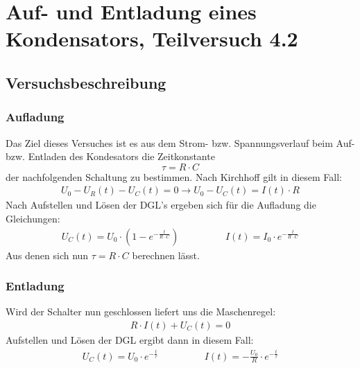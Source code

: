 \documentclass[12pt,a4paper]{article}
\begin{document}
\section{Auf- und Entladung eines Kondensators, Teilversuch 4.2}
\subsection{Versuchsbeschreibung}
\subsubsection*{Aufladung}
Das Ziel dieses Versuches ist es aus dem Strom- bzw. Spannungsverlauf beim Auf- bzw. Entladen des Kondesators die Zeitkonstante
\[\tau = R \cdot C \]
der nachfolgenden Schaltung zu bestimmen.
Nach Kirchhoff gilt in diesem Fall:
\begin{align*}
U_0-U_R(t)-U_C(t)=0 \rightarrow U_0-U_C(t)=I(t) \cdot R
\end{align*}
Nach Aufstellen und Lösen der DGL's ergeben sich für die Aufladung die Gleichungen:
\begin{align*}
U_C(t)=U_0 \cdot (1-e^{-\frac{t}{R \cdot C}}) \hspace{2cm} I(t)=I_0 \cdot e^{-\frac{t}{R \cdot C}}
\end{align*}
Aus denen sich nun $\tau=R \cdot C$ berechnen lässt.
\subsubsection*{Entladung}
Wird der Schalter nun geschlossen liefert uns die Maschenregel:
\begin{align*}
R \cdot I(t) + U_C(t) = 0
\end{align*}
Aufstellen und Lösen der DGL ergibt dann in diesem Fall:
\begin{align*}
U_C(t)=U_0 \cdot e^{-\frac{t}{\tau}} \hspace{2cm} I(t)=-\frac{U_0}{R} \cdot e^{-\frac{t}{\tau}}
\end{align*}
\end{document}
